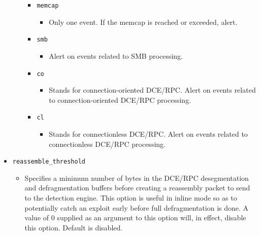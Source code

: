 \documentclass[english]{report}
\begin{document}
\begin{itemize}
\begin{itemize}
\begin{itemize}
\item[] \texttt{memcap}

\begin{itemize}
\item[] Only one event. If the memcap is reached or exceeded, alert.

\end{itemize}

\item[] \texttt{smb}

\begin{itemize}
\item[] Alert on events related to SMB processing.
\end{itemize}

\item[] \texttt{co}

\begin{itemize}

\item[] Stands for connection-oriented DCE/RPC. Alert on events related to
connection-oriented DCE/RPC processing.

\end{itemize}

\item[] \texttt{cl}
\begin{itemize}

\item[] Stands for connectionless DCE/RPC. Alert on events related to
connectionless DCE/RPC processing.

\end{itemize}
\end{itemize}
\end{itemize}

\item[] \texttt{reassemble\_threshold}
\begin{itemize}

\item[] Specifies a minimum number of bytes in the DCE/RPC desegmentation and
defragmentation buffers before creating a reassembly packet to send to the
detection engine. This option is useful in inline mode so as to potentially
catch an exploit early before full defragmentation is done.  A value of 0
supplied as an argument to this option will, in effect, disable this option.
Default is disabled.

\end{itemize}
\end{itemize}
\end{document}
